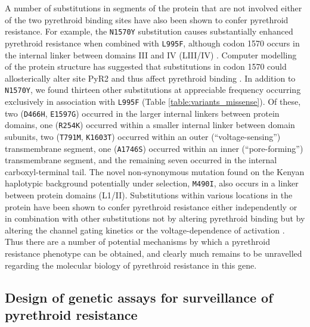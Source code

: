 \documentclass[a4paper,11pt,abstracton,hidelinks]{scrartcl}
\begin{document}
%
A number of substitutions in segments of the protein that are not involved either of the two pyrethroid binding sites have also been shown to confer pyrethroid resistance.
%
For example, the \texttt{N1570Y} substitution causes substantially enhanced pyrethroid resistance when combined with \texttt{L995F}, although codon 1570 occurs in the internal linker between domains III and IV (LIII/IV) \cite{Du2013}.
%
Computer modelling of the protein structure has suggested that substitutions in codon 1570 could allosterically alter site PyR2 and thus affect pyrethroid binding \cite{Du2013}.
%
In addition to \texttt{N1570Y}, we found thirteen other substitutions at appreciable frequency occurring exclusively in association with \texttt{L995F} (Table \ref{table:variants_missense}).
%
Of these, two (\texttt{D466H}, \texttt{E1597G}) occurred in the larger internal linkers between protein domains, one (\texttt{R254K}) occurred within a smaller internal linker between domain subunits, two (\texttt{T791M}, \texttt{K1603T}) occurred within an outer (``voltage-sensing'') transmembrane segment, one (\texttt{A1746S}) occurred within an inner (``pore-forming'') transmembrane segment, and the remaining seven occurred in the internal carboxyl-terminal tail.
%
The novel non-synonymous mutation found on the Kenyan haplotypic background potentially under selection, \texttt{M490I}, also occurs in a linker between protein domains (L1/II).
%
Substitutions within various locations in the protein have been shown to confer pyrethroid resistance either independently or in combination with other substitutions not by altering pyrethroid binding but by altering the channel gating kinetics or the voltage-dependence of activation \cite{Dong2014}.
%
Thus there are a number of potential mechanisms by which a pyrethroid resistance phenotype can be obtained, and clearly much remains to be unravelled regarding the molecular biology of pyrethroid resistance in this gene.


\subsection*{Design of genetic assays for surveillance of pyrethroid resistance}
\end{document}
